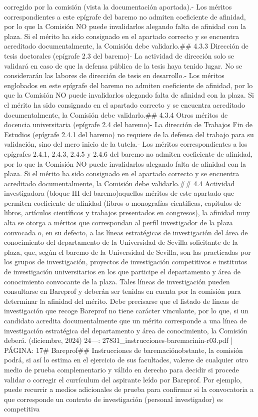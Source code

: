 \documentclass{article}
\begin{document}
\begin{itemize}
{{{{{corregido por la comisión (vista la documentación aportada).\n- Los méritos correspondientes a este epígrafe del baremo no admiten coeficiente de afinidad, por lo que la Comisión NO puede invalidarlos alegando falta de afinidad con la plaza. Si el mérito ha sido consignado en el apartado correcto y se encuentra acreditado documentalmente, la Comisión debe validarlo.\n\n## 4.3.3 Dirección de tesis doctorales (epígrafe 2.3 del baremo)\n\n- La actividad de dirección solo se validará en caso de que la defensa pública de la tesis haya tenido lugar. No se considerarán las labores de dirección de tesis en desarrollo.\n- Los méritos englobados en este epígrafe del baremo no admiten coeficiente de afinidad, por lo que la Comisión NO puede invalidarlos alegando falta de afinidad con la plaza. Si el mérito ha sido consignado en el apartado correcto y se encuentra acreditado documentalmente, la Comisión debe validarlo.\n\n## 4.3.4 Otros méritos de docencia universitaria (epígrafe 2.4 del baremo)\n\n- La dirección de Trabajos Fin de Estudios (epígrafe 2.4.1 del baremo) no requiere de la defensa del trabajo para su validación, sino del mero inicio de la tutela.\n- Los méritos correspondientes a los epígrafes 2.4.1, 2.4.3, 2.4.5 y 2.4.6 del baremo no admiten coeficiente de afinidad, por lo que la Comisión NO puede invalidarlos alegando falta de afinidad con la plaza. Si el mérito ha sido consignado en el apartado correcto y se encuentra acreditado documentalmente, la Comisión debe validarlo.\n\n## 4.4 Actividad investigadora (bloque III del baremo)\n\nEn aquellos méritos de este apartado que permiten coeficiente de afinidad (libros o monografías científicas, capítulos de libros, artículos científicos y trabajos presentados en congresos), la afinidad muy alta se otorga a méritos que correspondan al perfil investigador de la plaza convocada o, en su defecto, a las líneas estratégicas de investigación del área de conocimiento del departamento de la Universidad de Sevilla solicitante de la plaza, que, según el baremo de la Universidad de Sevilla, son las practicadas por los grupos de investigación, proyectos de investigación competitivos e institutos de investigación universitarios en los que participe el departamento y área de conocimiento convocante de la plaza. Tales líneas de investigación pueden consultarse en Bareprof y deberán ser tenidas en cuenta por la comisión para determinar la afinidad del mérito. Debe precisarse que el listado de líneas de investigación que recoge Bareprof no tiene carácter vinculante, por lo que, si un candidato acredita documentalmente que un mérito corresponde a una línea de investigación estratégica del departamento y área de conocimiento, la Comisión deberá.\n{} (diciembre, 2024) 24\n\n---\n\nFUENTE: 27831_instrucciones-baremacinin-r03.pdf | PÁGINA: 17\n# Bareprof\n\n## Instrucciones de baremación\n\nNo obstante, la comisión podrá, si así lo estima en el ejercicio de sus facultades, valerse de cualquier otro medio de prueba complementario y válido en derecho para decidir si procede validar o corregir el currículum del aspirante leído por Bareprof. Por ejemplo, puede recurrir a medios adicionales de prueba para confirmar si la convocatoria a que corresponde un contrato de investigación (personal investigador) es competitiva }}}}}
\end{itemize}
\end{document}
